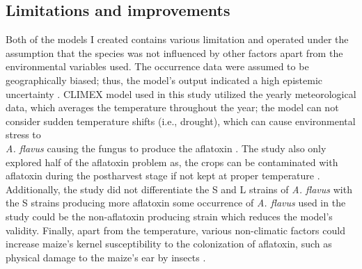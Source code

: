 \subsection{Limitations and improvements}
Both of the models I created contains various limitation and operated under the assumption that the species was not influenced by other factors apart from the environmental variables used. The occurrence data were assumed to be geographically biased; thus, the model's output indicated a high epistemic uncertainty \citep{kriticos2015climex}. CLIMEX model used in this study utilized the yearly meteorological data, which averages the temperature throughout the year; the model can not consider sudden temperature shifts (i.e., drought), which can cause environmental stress to \\ \textit{A. flavus} causing the fungus to produce the aflatoxin \citep{gallo2016effect} \citep{wu2016aflatoxin}. The study also only explored half of the aflatoxin problem as, the crops can be contaminated with aflatoxin during the postharvest stage if not kept at proper temperature \citep{kamano2022storage}. Additionally, the study did not differentiate the S and L strains of \textit{A. flavus} with the S strains producing more aflatoxin \citep{ehrlich2014non} some  occurrence of \textit{A. flavus} used in the study could be the non-aflatoxin producing strain which reduces the model's validity. Finally, apart from the temperature, various non-climatic factors could increase maize's kernel susceptibility to the colonization of aflatoxin, such as physical damage to the maize's ear by insects \citep{setamou1998effect}.

